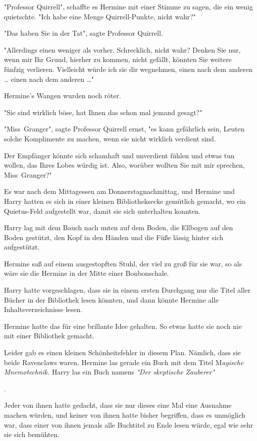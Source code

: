 {"Professor Quirrell", schaffte es Hermine mit einer Stimme zu sagen, die ein wenig quietschte. "Ich habe eine Menge Quirrell-Punkte, nicht wahr?"

"Das haben Sie in der Tat", sagte Professor Quirrell.

"Allerdings einen weniger als vorher. Schrecklich, nicht wahr? Denken Sie nur, wenn mir Ihr Grund, hierher zu kommen, nicht gefällt, könnten Sie weitere fünfzig verlieren. Vielleicht würde ich sie dir wegnehmen, einen nach dem anderen … einen nach dem anderen …"

Hermine's Wangen wurden noch röter.

"Sie sind wirklich böse, hat Ihnen das schon mal jemand gesagt?"

"Miss~Granger", sagte Professor Quirrell ernst, "es kann gefährlich sein, Leuten solche Komplimente zu machen, wenn sie nicht wirklich verdient sind.

Der Empfänger könnte sich schamhaft und unverdient fühlen und etwas tun wollen, das Ihres Lobes würdig ist. Also, worüber wollten Sie mit mir sprechen, Miss~Granger?"

Es war nach dem Mittagessen am Donnerstagnachmittag, und Hermine und Harry hatten es sich in einer kleinen Bibliotheksecke gemütlich gemacht, wo ein Quietus-Feld aufgestellt war, damit sie sich unterhalten konnten.

Harry lag mit dem Bauch nach unten auf dem Boden, die Ellbogen auf den Boden gestützt, den Kopf in den Händen und die Füße lässig hinter sich aufgestützt.

Hermine saß auf einem ausgestopften Stuhl, der viel zu groß für sie war, so als wäre sie die Hermine in der Mitte einer Bonbonschale.

Harry hatte vorgeschlagen, dass sie in einem ersten Durchgang nur die Titel aller Bücher in der Bibliothek lesen könnten, und dann könnte Hermine alle Inhaltsverzeichnisse lesen.

Hermine hatte das für eine brillante Idee gehalten. So etwas hatte sie noch nie mit einer Bibliothek gemacht.

Leider gab es einen kleinen Schönheitsfehler in diesem Plan. Nämlich, dass sie beide Ravenclaws waren. Hermine las gerade ein Buch mit dem Titel M\emph{agische Mnemotechnik.} Harry las ein Buch namens \emph{"Der skeptische Zauberer"}

.

Jeder von ihnen hatte gedacht, dass sie nur dieses eine Mal eine Ausnahme machen würden, und keiner von ihnen hatte bisher begriffen, dass es unmöglich war, dass einer von ihnen jemals alle Buchtitel zu Ende lesen würde, egal wie sehr sie sich bemühten.

}
